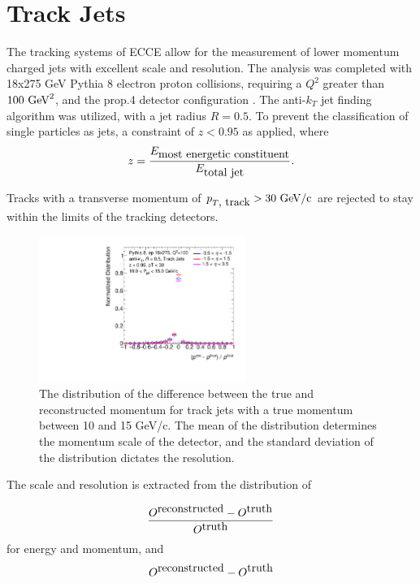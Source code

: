 \section {Track Jets}
\label{section2}

The tracking systems of ECCE allow for the measurement of lower momentum charged jets with excellent scale and resolution.  The analysis was completed with 18x275 GeV Pythia 8 electron proton collisions, requiring a $Q^2$ greater than $100 \hbox{ GeV}^2$, and the prop.4 detector configuration \cite{ecce-note-comp-2021-02}.  The anti-$k_T$ jet finding algorithm was utilized, with a jet radius $R=0.5$.  To prevent the classification of single particles as jets, a constraint of $z<0.95$ as applied, where 
\begin{equation}
z=\frac{E_{\hbox{most energetic constituent}}}{E_{\hbox{total jet}}}.
\label{eq:jet_z}
\end{equation}

Tracks with a transverse momentum of $p_{T\hbox{, track}} > 30\hbox{ GeV/c}$ are rejected to stay within the limits of the tracking detectors.

\begin{figure}[h]
    \centering
    \includegraphics[width=0.6\textwidth]{figs/Final_Plots/JES_Slice_Plot_EtaBins2_grouped.pdf}
    \caption{The distribution of the difference between the true and reconstructed momentum for track jets with a true momentum between 10 and 15 GeV/c.  The mean of the distribution determines the momentum scale of the detector, and the standard deviation of the distribution dictates the resolution.}
    \label{fig:track_momentum_slice}
\end{figure}

The scale and resolution is extracted from the distribution of 

\begin{equation}
    \frac{O^{\hbox{reconstructed}}-O^{\hbox{truth}}}{O^{\hbox{truth}}}
    \label{eq:distribution}
\end{equation}
for energy and momentum, and 
\begin{equation}
    O^{\hbox{reconstructed}}-O^{\hbox{truth}}
    \label{eq:distribution}
\end{equation}

